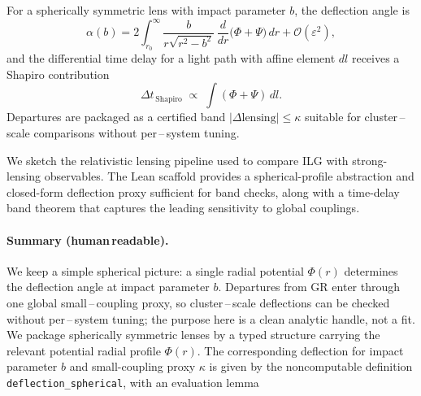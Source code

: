 \documentclass[aps,prd,twocolumn,superscriptaddress,nofootinbib,floatfix,longbibliography]{revtex4-2}
\newcommand{\Order}{\mathcal{O}}
\newcommand{\lean}[1]{\texttt{\detokenize{#1}}}
\begin{document}
For a spherically symmetric lens with impact parameter $b$, the deflection angle is
\begin{equation}
  \alpha(b) = 2 \int_{r_0}^{\infty} \frac{b}{r\sqrt{r^2-b^2}}\,\frac{d}{dr}\big(\Phi+\Psi\big)\,dr + \Order(\varepsilon^2),
  \label{eq:deflection}
\end{equation}
and the differential time delay for a light path with affine element $dl$ receives a Shapiro contribution
\begin{equation}
  \Delta t_{\!\,\mathrm{Shapiro}} \;\propto\; \int (\Phi+\Psi)\, dl.
  \label{eq:shapiro}
\end{equation}
Departures are packaged as a certified band $\lvert\Delta\mathrm{lensing}\rvert\le\kappa$ suitable for cluster\,–\,scale comparisons without per\,–\,system tuning.

We sketch the relativistic lensing pipeline used to compare ILG with strong-lensing observables. The Lean scaffold provides a spherical-profile abstraction and closed-form deflection proxy sufficient for band checks, along with a time-delay band theorem that captures the leading sensitivity to global couplings.
%
\paragraph*{Summary (human\,readable).}
We keep a simple spherical picture: a single radial potential $\Phi(r)$ determines the deflection angle at impact parameter $b$. Departures from GR enter through one global small\,–\,coupling proxy, so cluster\,–\,scale deflections can be checked without per\,–\,system tuning; the purpose here is a clean analytic handle, not a fit.
We package spherically symmetric lenses by a typed structure \lean{SphericalProfile} carrying the relevant potential radial profile $\Phi(r)$. The corresponding deflection for impact parameter $b$ and small-coupling proxy $\kappa$ is given by the noncomputable definition \texttt{deflection\_spherical}, with an evaluation lemma
\end{document}
